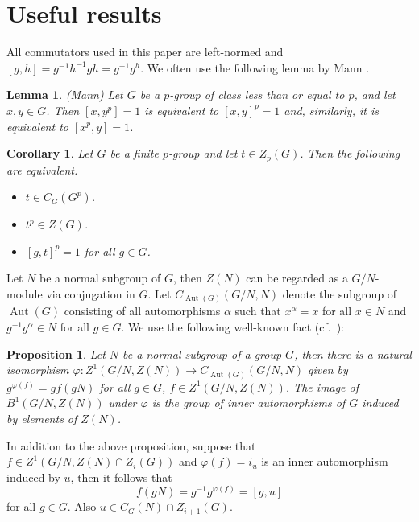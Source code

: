 \documentclass[preprint,sort&compress,12pt]{elsarticle}
\newtheorem{lemma}[theorem]{Lemma}
\newtheorem{corollary}[theorem]{Corollary}
\newtheorem{prop}[theorem]{Proposition}
\theoremstyle{definition}
\numberwithin{equation}{theorem}
\DeclareMathOperator{\Aut}{\operatorname{Aut}}
\begin{document}
\section{Useful results}
 All commutators used in this paper are left-normed and $[g, h]= g^{-1}h^{-1}gh=g^{-1}g^{h}$. We often use the following lemma by Mann \cite{AM}.
\begin{lemma}\label{L:3.1}(Mann)
Let $G$ be a $p$-group of class less than or equal to $p$, and let $x, y\in G$. Then $[x, y^p]=1$ is equivalent to $[x, y]^p=1$ and, similarly, it is equivalent to $[x^p, y]=1$.
\end{lemma}

\begin{corollary}\label{cr:3.2}
Let $G$ be a finite $p$-group and let $t\in Z_p(G)$. Then the following are equivalent.
\begin{itemize}
\item [$(i)$] $t\in C_G(G^p)$.
\item [$(ii)$] $t^p\in Z(G)$.
\item [$(iii)$] $[g, t]^p=1$ for all $g\in G$.
\end{itemize}
\end{corollary}

Let $N$ be a normal subgroup of $G$, then $Z(N)$ can be regarded as a $G/N$-module via conjugation in $G$. Let $C_{\Aut(G)}(G/N, N)$ denote the subgroup of $\Aut(G)$ consisting of all automorphisms $\alpha$ such that $x^{\alpha}=x$ for all $x\in N$ and $g^{-1}g^{\alpha}\in N$ for all $g\in G$. We use the following well-known fact (cf.\ \cite[Satz I.4.4]{BH}):
\begin{prop}\label{P:3.3}
Let $N$ be a normal subgroup of a group $G$, then there is a natural isomorphism $\varphi:Z^1(G/N, Z(N))\rightarrow C_{\Aut(G)}(G/N, N)$ given by $g^{\varphi(f)}=gf(gN)$ for all $g\in G$, $f\in Z^1(G/N, Z(N))$. The image of $B^1(G/N, Z(N))$ under $\varphi$ is the group of inner automorphisms of $G$ induced by elements of $Z(N)$.
\end{prop}

In addition to the above proposition, suppose that $f\in Z^1(G/N, Z(N)\cap Z_i(G))$ and $\varphi(f)=i_u$ is an inner automorphism induced by $u$, then it follows that
\begin{equation}\label{eq:3.3.1}
f(gN)=g^{-1}g^{\varphi(f)}=[g, u]
\end{equation}
\noindent for all $g\in G$. Also $u\in C_G(N)\cap Z_{i+1}(G)$.
\end{document}
